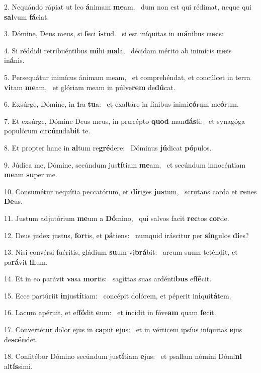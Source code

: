 2. Nequándo rápiat ut leo \textbf{á}nimam \textbf{me}am, \ast\  dum non est qui rédimat, neque qui \textbf{sal}vum \textbf{fá}ciat.\

3. Dómine, Deus meus, si \textbf{fe}ci \textbf{is}tud. \ast\  si est iníquitas in \textbf{má}nibus \textbf{me}is:\

4. Si réddidi retribuéntibus \textbf{mi}hi \textbf{ma}la, \ast\  décidam mérito ab inimícis \textbf{me}is in\textbf{á}nis.\

5. Persequátur inimícus ánimam meam, \dag\  et comprehéndat, et concúlcet in terra \textbf{vi}tam \textbf{me}am, \ast\  et glóriam meam in púlve\textbf{rem} de\textbf{dú}cat.\

6. Exsúrge, Dómine, in \textbf{i}ra \textbf{tu}a: \ast\  et exaltáre in fínibus inimi\textbf{có}rum me\textbf{ó}rum.\

7. Et exsúrge, Dómine Deus meus, in præcépto \textbf{quod} man\textbf{dás}ti: \ast\  et synagóga populórum cir\textbf{cúm}da\textbf{bit} te.\

8. Et propter hanc in \textbf{al}tum re\textbf{gré}dere: \ast\  Dóminus \textbf{jú}dicat \textbf{pó}pulos.\

9. Júdica me, Dómine, secúndum jus\textbf{tí}tiam \textbf{me}am, \ast\  et secúndum innocéntiam \textbf{me}am \textbf{su}per me.\

10. Consumétur nequítia peccatórum, et \textbf{dí}riges \textbf{jus}tum, \ast\  scrutans corda et \textbf{re}nes \textbf{De}us.\

11. Justum adjutórium \textbf{me}um a \textbf{Dó}mino, \ast\  qui salvos facit \textbf{rec}tos \textbf{cor}de.\

12. Deus judex justus, \textbf{for}tis, et \textbf{pá}tiens: \ast\  numquid iráscitur per \textbf{sín}gulos \textbf{di}es?\

13. Nisi convérsi fuéritis, gládium \textbf{su}um vi\textbf{brá}bit: \ast\  arcum suum teténdit, et pa\textbf{rá}vit \textbf{il}lum.\

14. Et in eo parávit \textbf{va}sa \textbf{mor}tis: \ast\  sagíttas suas ardénti\textbf{bus} ef\textbf{fé}cit.\

15. Ecce partúriit \textbf{in}jus\textbf{tí}tiam: \ast\  concépit dolórem, et péperit in\textbf{i}qui\textbf{tá}tem.\

16. Lacum apéruit, et ef\textbf{fó}dit \textbf{e}um: \ast\  et íncidit in fóve\textbf{am} quam \textbf{fe}cit.\

17. Convertétur dolor ejus in \textbf{ca}put \textbf{e}jus: \ast\  et in vérticem ipsíus iníquitas \textbf{e}jus de\textbf{scén}det.\

18. Confitébor Dómino secúndum jus\textbf{tí}tiam \textbf{e}jus: \ast\  et psallam nómini Dómi\textbf{ni} al\textbf{tís}simi.\

